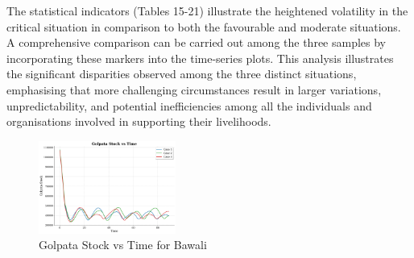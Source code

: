 \documentclass[final,5p,times,twocolumn,authoryear]{elsarticle}
\begin{document}
The statistical indicators (Tables 15-21) illustrate the heightened volatility in the critical situation in comparison to both the favourable and moderate situations. A comprehensive comparison can be carried out among the three samples by incorporating these markers into the time-series plots. This analysis illustrates the significant disparities observed among the three distinct situations, emphasising that more challenging circumstances result in larger variations, unpredictability, and potential inefficiencies among all the individuals and organisations involved in supporting their livelihoods.\\
\begin{figure}[htbp]
    \centering
    \includegraphics[width=0.4\textwidth]{graph_all/plots_crit/golpata_stock_vs_time.png}
    \caption{Golpata Stock vs Time for Bawali}
    \label{fig:bawali}
\end{figure}
\begin{table}[htbp]
    \centering
    \caption{Golpata Stock - Statistical Analysis}
\end{table}
\end{document}
